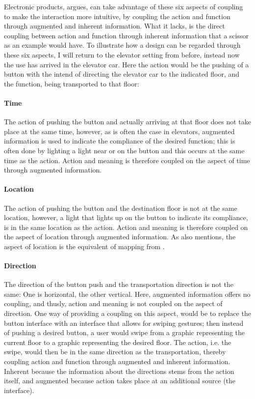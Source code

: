 Electronic products,  argues, can take advantage of these six aspects of coupling to make the interaction more intuitive, by coupling the action and function through augmented and inherent information. What it lacks, is the direct coupling between action and function through inherent information that a scissor as an example would have. To illustrate how a design can be regarded through these six aspects, I will return to the elevator setting from before, instead now the use has arrived in the elevator car. Here the action would be the pushing of a button with the intend of directing the elevator car to the indicated floor, and the function, being transported to that floor:
\paragraph{Time} The action of pushing the button and actually arriving at that floor does not take place at the same time, however, as is often the case in elevators, augmented information is used to indicate the compliance of the desired function; this is often done by lighting a light near or on the button and this occurs at the same time as the action. Action and meaning is therefore coupled on the aspect of time through augmented information.
\paragraph{Location} The action of pushing the button and the destination floor is not at the same location, however, a light that lights up on the button to indicate its compliance, is in the same location as the action. Action and meaning is therefore coupled on the aspect of location through augmented information. As  also mentions, the aspect of location is the equivalent of mapping from .
\paragraph{Direction} The direction of the button push and the transportation direction is not the same: One is horizontal, the other vertical. Here, augmented information offers no coupling, and thusly, action and meaning is not coupled on the aspect of direction. One way of providing a coupling on this aspect, would be to replace the button interface with an interface that allows for swiping gestures; then instead of pushing a desired button, a user would swipe from a graphic representing the current floor to a graphic representing the desired floor. The action, i.e. the swipe, would then be in the same direction as the transportation, thereby coupling action and function through augmented and inherent information. Inherent because the information about the directions stems from the action itself, and augmented because action takes place at an additional source (the interface).
